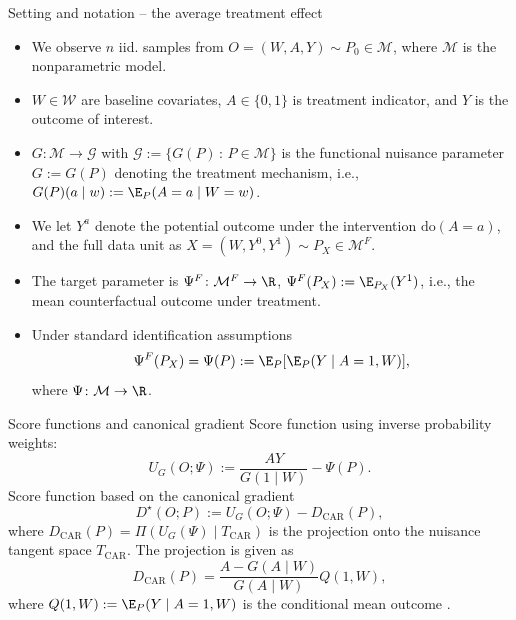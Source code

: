 \documentclass[smaller]{beamer}\usepackage{listings}
\begin{document}
\begin{frame}[label={sec:org1299746}]{Setting and notation -- the average treatment effect}
\begin{itemize}[<+->]
\item We observe \(n\) iid. samples from \(O = (W, A, Y) \sim P_0 \in \mathcal M\), where \(\mathcal M\)
is the nonparametric model.
\item \(W \in \mathcal W\) are baseline covariates, \(A \in \{0,1\}\) is treatment indicator, and \(Y\)
is the outcome of interest.
\item \(G \colon \mathcal M \rightarrow \mathcal G\) with \(\mathcal G := \{G(P) \, : \, P \in \mathcal
  M\}\) is the functional nuisance parameter \(G := G(P)\) denoting the treatment mechanism, i.e.,
\(G(P)(a \mid w) := \E_{P}(A=a \mid W=w)\).
\item We let \(Y^a\) denote the potential outcome under the intervention \(\mathrm{do}(A = a)\), and the
full data unit as \(X = (W, Y^0, Y^1) \sim P_X \in \mathcal M^F\).
\item The target parameter is \(\Psi^F \colon \mathcal M^F \rightarrow \R\), \(\Psi^F(P_X) :=
  \E_{P_X}(Y^1)\), i.e., the mean counterfactual outcome under treatment.
\item Under standard identification assumptions
\begin{equation*}
  \Psi^F(P_X) = \Psi(P) := \E_{P}[\E_{P}(Y \mid A=1, W)],
\end{equation*}
where \(\Psi\colon \mathcal M \rightarrow \R\).
\end{itemize}
\end{frame}

\begin{frame}[label={sec:org02de93a}]{Score functions and canonical gradient}
Score function using inverse probability weights:
\begin{equation*}
  U_G(O; \Psi) := \frac{AY}{G(1 \mid W)} - \Psi(P).
\end{equation*}
\pause Score function based on the canonical gradient
\begin{equation*}
  D^{\star}(O; P) := U_G(O; \Psi) - D_{\text{CAR}}(P),
\end{equation*}
where \(D_{\text{CAR}}(P) = \Pi(U_G(\Psi) \mid T_{\text{CAR}})\) is the projection onto the nuisance
tangent space \(T_{\text{CAR}}\). \pause The projection is given as
\begin{equation*}
  D_{\text{CAR}}(P) = \frac{A - G(A \mid W)}{G(A \mid W)}Q(1, W),
\end{equation*}
where \(Q(1, W) := \E_{P}(Y \mid A=1, W)\) is the conditional mean outcome \citep{robins1994estimation,van2003unified}.
\end{frame}
\end{document}

